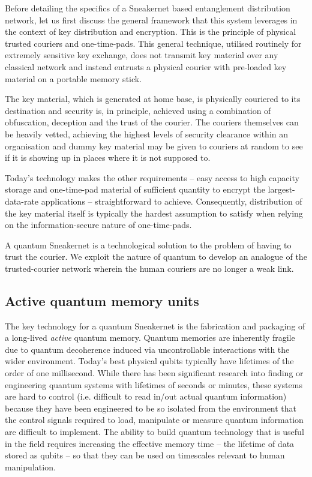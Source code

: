 \documentclass[twocolumn, aps, rmp, amsmath, amssymb, nofootinbib, superscriptaddress, longbibliography, floatfix, table-of-contents, eqsecnum]{revtex4-2}
\begin{document}
Before detailing the specifics of a Sneakernet based entanglement distribution network, let us first discuss the general framework that this system leverages in the context of key distribution and encryption. This is the principle of physical trusted couriers and one-time-pads. This general technique, utilised routinely for extremely sensitive key exchange, does not transmit key material over any classical network and instead entrusts a physical courier with pre-loaded key material on a portable memory stick. 

The key material, which is generated at home base, is physically couriered to its destination and security is, in principle, achieved using a combination of obfuscation, deception and the trust of the courier. The couriers themselves can be heavily vetted, achieving the highest levels of security clearance within an organisation and dummy key material may be given to couriers at random to see if it is showing up in places where it is not supposed to. 

Today's technology makes the other requirements -- easy access to high capacity storage and one-time-pad material of sufficient quantity to encrypt the largest-data-rate applications -- straightforward to achieve. Consequently, distribution of the key material itself is typically the hardest assumption to satisfy when relying on the information-secure nature of one-time-pads.

A quantum Sneakernet is a technological solution to the problem of having to trust the courier. We exploit the nature of quantum to develop an analogue of the trusted-courier network wherein the human couriers are no longer a weak link. 

\subsection{Active quantum memory units}

The key technology for a quantum Sneakernet is the fabrication and packaging of a long-lived \textit{active} quantum memory. Quantum memories are inherently fragile due to quantum decoherence induced via uncontrollable interactions with the wider environment. Today's best physical qubits typically have lifetimes of the order of one millisecond. While there has been significant research into finding or engineering quantum systems with lifetimes of seconds or minutes, these systems are hard to control (i.e. difficult to read in/out actual quantum information) because they have been engineered to be so isolated from the environment that the control signals required to load, manipulate or measure quantum information are difficult to implement. The ability to build quantum technology that is useful in the field requires increasing the effective memory time -- the lifetime of data stored as qubits -- so that they can be used on timescales relevant to human manipulation. 
\end{document}
